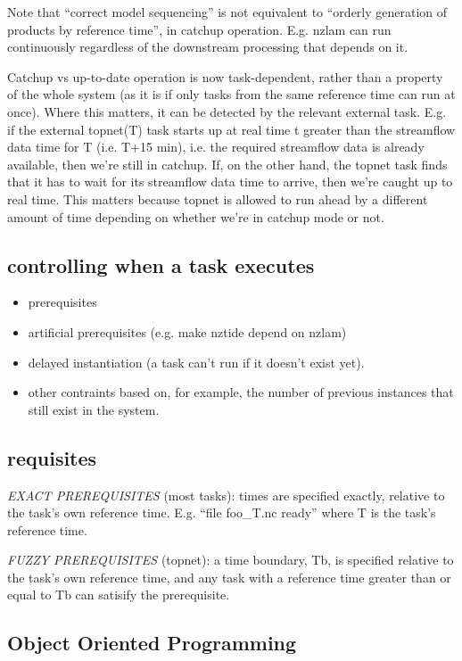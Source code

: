 \documentclass[12pt]{article}
\begin{document}
Note that ``correct model sequencing'' is not equivalent to ``orderly
generation of products by reference time'', in catchup operation.  E.g.
nzlam can run continuously regardless of the downstream processing that
depends on it.

Catchup vs up-to-date operation is now task-dependent, rather than a
property of the whole system (as it is if only tasks from the same
reference time can run at once).  Where this matters, it can be detected
by the relevant external task. E.g. if the external topnet(T) task
starts up at real time t greater than the streamflow data time for T
(i.e. T+15 min), i.e. the required streamflow data is already available,
then we're still in catchup. If, on the other hand, the topnet task
finds that it has to wait for its streamflow data time to arrive, then
we're caught up to real time.  This matters because topnet is allowed to
run ahead by a different amount of time depending on whether we're in
catchup mode or not.


\subsection{controlling when a task executes}

\begin{itemize}
 \item  prerequisites
 \item artificial prerequisites (e.g. make nztide depend on nzlam)
 \item delayed instantiation (a task can't run if it doesn't exist yet).
 \item other contraints based on, for example, the number of previous instances
       that still exist in the system.
\end{itemize}


\subsection{requisites}

{\em EXACT PREREQUISITES} (most tasks): times are specified exactly,
relative to the task's own reference time.  E.g. ``file foo\_{T}.nc
ready'' where T is the task's reference time.

{\em FUZZY PREREQUISITES} (topnet): a time boundary, Tb, is specified
relative to the task's own reference time, and any task with a reference
time greater than or equal to Tb can satisify the prerequisite.


\subsection{Object Oriented Programming}
\end{document}
